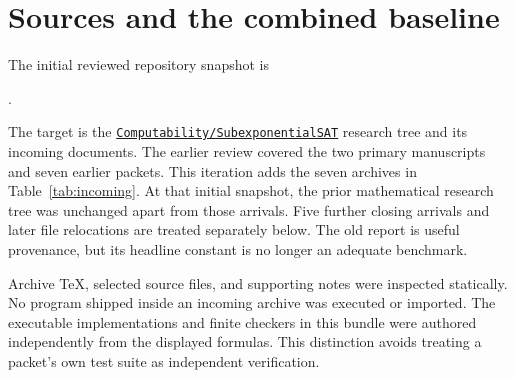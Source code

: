 \documentclass[11pt,letterpaper]{article}
\theoremstyle{remark}\newtheorem{remark}[theorem]{Remark}
\begin{document}
\section{Sources and the combined baseline}
\label{sec:sources}
The initial reviewed repository snapshot is
\begin{center}\small\texttt{\Pin}.\end{center}
The target is the \href{https://github.com/VladimirReshetnikov/ProveIt/tree/ab2fbc9e03d5c3d0ad6dec8686960bfe498b0b06/Computability/SubexponentialSAT}{\texttt{Computability/SubexponentialSAT}} research tree and its incoming documents. The earlier review covered the two primary manuscripts and seven earlier packets. This iteration adds the seven archives in Table~\ref{tab:incoming}. At that initial snapshot, the prior mathematical research tree was unchanged apart from those arrivals. Five further closing arrivals and later file relocations are treated separately below. The old report is useful provenance, but its headline constant is no longer an adequate benchmark.

Archive TeX, selected source files, and supporting notes were inspected statically. No program shipped inside an incoming archive was executed or imported. The executable implementations and finite checkers in this bundle were authored independently from the displayed formulas. This distinction avoids treating a packet's own test suite as independent verification.
\end{document}
